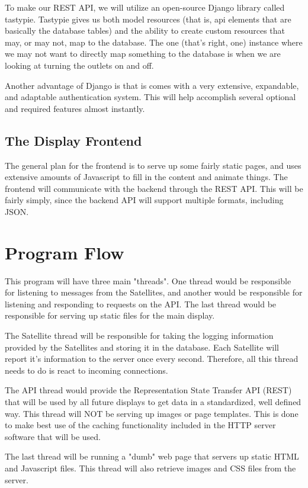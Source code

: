 To make our REST API, we will utilize an open-source Django library called tastypie. Tastypie gives us both model resources (that is, api elements that are basically the database tables) and the ability to create custom resources that may, or may not, map to the database. The one (that's right, one) instance where we may not want to directly map something to the database is when we are looking at turning the outlets on and off.

Another advantage of Django is that is comes with a very extensive, expandable, and adaptable authentication system. This will help accomplish several optional and required features almost instantly. 

\subsection{The Display Frontend}

The general plan for the frontend is to serve up some fairly static pages, and uses extensive amounts of Javascript to fill in the content and animate things. The frontend will communicate with the backend through the REST API. This will be fairly simply, since the backend API will support multiple formats, including JSON.

\section{Program Flow}

This program will have three main "threads". One thread would be responsible for listening to messages from the Satellites, and another would be responsible for listening and responding to requests on the API. The last thread would be responsible for serving up static files for the main display.

The Satellite thread will be responsible for taking the logging information provided by the Satellites and storing it in the database. Each Satellite will report it's information to the server once every second. Therefore, all this thread needs to do is react to incoming connections.

The API thread would provide the Representation State Transfer API (REST) that will be used by all future displays to get data in a standardized, well defined way. This thread will NOT be serving up images or page templates. This is done to make best use of the caching functionality included in the HTTP server software that will be used.

The last thread will be running a "dumb" web page that servers up static HTML and Javascript files. This thread will also retrieve images and CSS files from the server.


